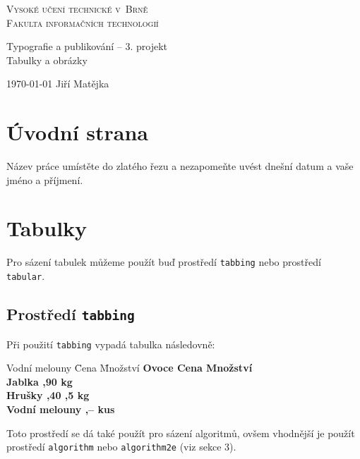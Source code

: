 \documentclass[a4paper, 11pt]{article}
\begin{document}
\thispagestyle{empty}
\begin{center}

\textsc{
\Huge{Vysoké učení technické v~Brně \\}
\huge{Fakulta informačních technologií\\}
}


\LARGE{Typografie a publikování -- 3. projekt \\}
\Huge{Tabulky a obrázky\\}

\end{center}

\Large{\today} \hfill Jiří Matějka

\newpage
\normalsize
\setcounter{page}{1}
\section{Úvodní strana}
Název práce umístěte do zlatého řezu a nezapomeňte uvést dnešní datum a vaše jméno a příjmení.


\section{Tabulky}
Pro sázení tabulek můžeme použít buď prostředí \texttt{tabbing} nebo prostředí \texttt{tabular}.

\subsection{Prostředí \texttt{tabbing}}
Při použití \texttt{tabbing} vypadá tabulka následovně:
    \begin{tabbing}
    Vodní melouny \quad \= Cena \quad
    \= Množství \kill
    \bfseries Ovoce \>
    \bfseries Cena \>
    \bfseries Množství \\
    Jablka ,90  kg \\
    Hrušky ,40 ,5 kg \\
    Vodní melouny ,--  kus
    \end{tabbing}
Toto prostředí se dá také použít pro sázení algoritmů, ovšem vhodnější je použít 
prostředí \texttt{algorithm} nebo \texttt{algorithm2e} (viz sekce 3).
\end{document}
